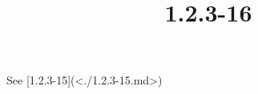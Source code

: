 \documentclass{article}
\title{1.2.3-16}
\begin{document}
\maketitle

See [1.2.3-15](<./1.2.3-15.md>)
\end{document}
